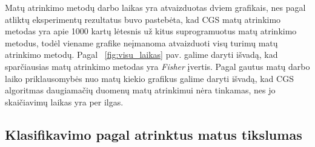 Matų atrinkimo metodų darbo laikas yra atvaizduotas dviem grafikais, nes pagal atliktų eksperimentų rezultatus buvo pastebėta, kad CGS matų atrinkimo metodas yra apie 1000 kartų lėtesnis už kitus suprogramuotus matų atrinkimo metodus, todėl viename grafike neįmanoma atvaizduoti visų turimų matų atrinkimo metodų. Pagal ~\ref{fig:visu_laikas} pav. galime daryti išvadą, kad sparčiausias matų atrinkimo metodas yra \textit{Fisher} įvertis. Pagal gautus matų darbo laiko priklausomybės nuo matų kiekio grafikus galime daryti išvadą, kad CGS algoritmas daugiamačių duomenų matų atrinkimui nėra tinkamas, nes jo skaičiavimų laikas yra per ilgas.

\subsection{Klasifikavimo pagal atrinktus matus tikslumas}

